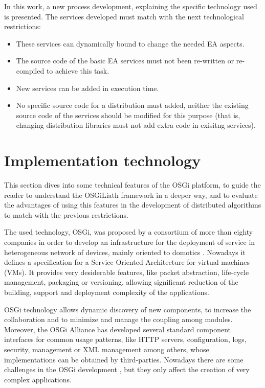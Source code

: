 \documentclass{sig-alternate}
\begin{document}
In this work, a new process development, explaining the specific technology used is presented. The services developed must match with the next technological restrictions:
\begin{itemize}
\item These services can dynamically bound to cha\-nge the needed EA aspects. 
\item The source code of  the basic EA services must not been re-written or re-compiled to achieve this task. 
\item New services can be added in execution time. 
\item No specific source code for a distribution must added, neither the existing source code of the services should be modified for this purpose (that is, changing distribution libraries must not add extra code in exisitng services).
\end{itemize}


\section{Implementation technology}
\label{sec:technology}
This section dives into some technical features of the OSGi platform, to guide the reader to understand the OSGiLiath framework in a deeper way, and to evaluate the advantages of using this features in the development of distributed algorithms to match with the previous restrictions.

The used technology, OSGi, was proposed by a consortium of more than
eighty companies in order to develop an infrastructure for the
deployment of service in heterogeneous network of devices, mainly
oriented to domotics \cite{GATEWAY}. Nowadays it defines a
specification for a Service Oriented Architecture for virtual
machines (VMs). It provides very desiderable features, like
packet abstraction, life-cycle management, packaging or versioning,
allowing significant reduction of the building, support and deployment
complexity of the applications. 

OSGi technology allows dynamic discovery of new components, to increase the collaboration and to minimize and manage the coupling
among modules. Moreover, the
OSGi Alliance has developed several standard component interfaces for
common usage patterns, like HTTP servers, configuration, logs, security,
management or XML management among others, whose implementations can
be obtained by third-parties. Nowadays there are some challenges 
in the OSGi development \cite{OSGICHALLENGES}, but they only affect the creation of very complex applications.
\end{document}
